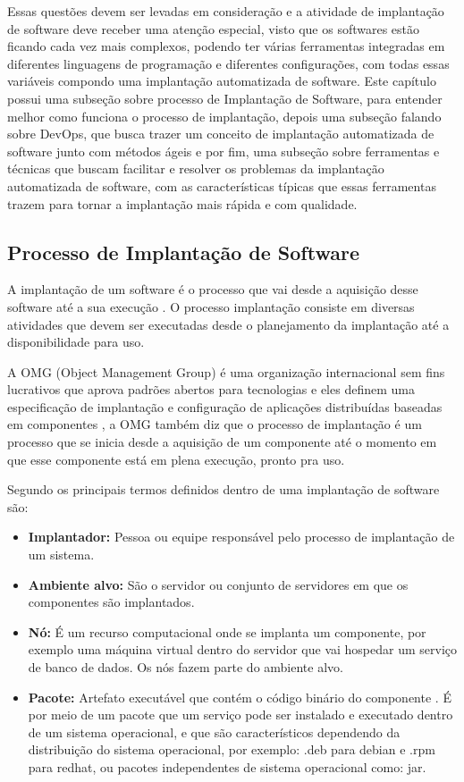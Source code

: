 Essas questões devem ser levadas em consideração e a atividade de implantação de
software deve receber uma atenção especial, visto que os softwares estão ficando
cada vez mais complexos, podendo ter várias ferramentas integradas em diferentes
linguagens de programação e diferentes configurações, com todas essas variáveis compondo
uma implantação automatizada de software. Este capítulo possui uma subseção sobre
processo de Implantação de Software, para entender melhor como funciona o processo de implantação,
depois uma subseção falando sobre DevOps, que busca trazer um conceito de implantação
automatizada de software junto com métodos ágeis e por fim, uma subseção sobre
ferramentas e técnicas que buscam facilitar e resolver os problemas da
implantação automatizada de software, com as características típicas que essas
ferramentas trazem para tornar a implantação mais rápida e com qualidade.

\subsection{Processo de Implantação de Software}

A implantação de um software é o processo que vai desde a aquisição desse software
até a sua execução \cite{leo2014}. O processo implantação consiste em diversas
atividades que devem ser executadas desde o planejamento da implantação até a
disponibilidade para uso.

A OMG (Object Management Group) é uma organização internacional sem fins lucrativos
que aprova padrões abertos para tecnologias e eles definem uma especificação de
implantação e configuração de aplicações distribuídas baseadas em componentes \cite{omg2006},
a OMG também diz que o processo de implantação é um processo que se inicia desde
a aquisição de um componente até o momento em que esse componente está em plena
execução, pronto pra uso.

Segundo \cite{omg2006} os principais termos definidos dentro de uma implantação
de software são:

\begin{itemize}
  \item  \textbf{Implantador:} Pessoa ou equipe responsável pelo processo de
  implantação  de um sistema.
  \item  \textbf{Ambiente alvo:} São o servidor ou conjunto de servidores em
  que os componentes são implantados.
  \item  \textbf{Nó:} É um recurso computacional onde se implanta um componente,
  por exemplo uma máquina virtual dentro do servidor que vai hospedar um serviço
  de banco de dados. Os nós fazem parte do ambiente alvo.
  \item  \textbf{Pacote:} Artefato executável que contém o código binário do componente
  . É por meio de um pacote que um serviço pode ser instalado e executado dentro
  de um sistema operacional, e que são característicos dependendo da distribuição
  do sistema operacional, por exemplo: .deb para debian e .rpm para redhat, ou
  pacotes independentes de sistema operacional como: jar.
\end{itemize}

